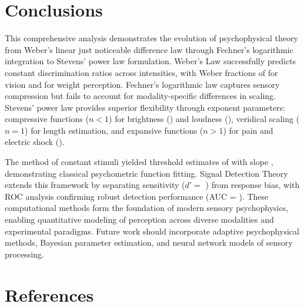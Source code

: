 \documentclass[11pt,a4paper]{article}
\begin{document}
\section{Conclusions}

This comprehensive analysis demonstrates the evolution of psychophysical theory from Weber's linear just noticeable difference law through Fechner's logarithmic integration to Stevens' power law formulation. Weber's Law successfully predicts constant discrimination ratios across intensities, with Weber fractions of  for vision and  for weight perception. Fechner's logarithmic law captures sensory compression but fails to account for modality-specific differences in scaling. Stevens' power law provides superior flexibility through exponent parameters: compressive functions ($n < 1$) for brightness () and loudness (), veridical scaling ($n = 1$) for length estimation, and expansive functions ($n > 1$) for pain and electric shock ().

The method of constant stimuli yielded threshold estimates of  with slope , demonstrating classical psychometric function fitting. Signal Detection Theory extends this framework by separating sensitivity ($d' = $ ) from response bias, with ROC analysis confirming robust detection performance (AUC = ). These computational methods form the foundation of modern sensory psychophysics, enabling quantitative modeling of perception across diverse modalities and experimental paradigms. Future work should incorporate adaptive psychophysical methods, Bayesian parameter estimation, and neural network models of sensory processing.

\section*{References}
\end{document}
